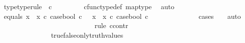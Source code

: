 \begin{isabellebody}
\ {\isasymomega}{}{\isacharunderscore}{\kern0pt}type{\isacharbrackleft}{\kern0pt}type{\isacharunderscore}{\kern0pt}rule{\isacharbrackright}{\kern0pt}{\isacharcolon}{\kern0pt}\ {\isachardoublequoteopen}{\isasymomega}{}\ {\isasymin}\isactrlsub c\ {\isasymOmega}{\isachardoublequoteclose}\isanewline
\ \ \ \ \ \ \isamarkupfalse%
\ cfunc{\isacharunderscore}{\kern0pt}type{\isacharunderscore}{\kern0pt}def\ map{\isacharunderscore}{\kern0pt}type\ \isamarkupfalse%
\ auto\isanewline
\ \ \ \ \isanewline
\ \ \ \ \isamarkupfalse%
\ equals{\isacharcolon}{\kern0pt}\ {\isachardoublequoteopen}{\isacharparenleft}{\kern0pt}x{}\ {\isasymamalg}\ x{}\ {\isasymcirc}\isactrlsub c\ case{\isacharunderscore}{\kern0pt}bool{\isacharparenright}{\kern0pt}\ {\isasymcirc}\isactrlsub c\ {\isasymomega}{}\ {\isacharequal}{\kern0pt}\ {\isacharparenleft}{\kern0pt}x{}\ {\isasymamalg}\ x{}\ {\isasymcirc}\isactrlsub c\ case{\isacharunderscore}{\kern0pt}bool{\isacharparenright}{\kern0pt}\ {\isasymcirc}\isactrlsub c\ {\isasymomega}{}{\isachardoublequoteclose}\isanewline
\ \ \ \ \isamarkupfalse%
\ {\isachardoublequoteopen}{\isasymomega}{}\ {\isacharequal}{\kern0pt}\ {\isasymomega}{}{\isachardoublequoteclose}\isanewline
\ \ \ \ \isamarkupfalse%
{\isacharparenleft}{\kern0pt}cases\ {\isachardoublequoteopen}{\isasymomega}{}\ {\isacharequal}{\kern0pt}\ {\isasymt}{\isachardoublequoteclose}{\isacharcomma}{\kern0pt}\ auto{\isacharparenright}{\kern0pt}\isanewline
\ \ \ \ \ \ \isamarkupfalse%
\ {\isachardoublequoteopen}{\isasymomega}{}\ {\isacharequal}{\kern0pt}\ {\isasymt}{\isachardoublequoteclose}\isanewline
\ \ \ \ \ \ \isamarkupfalse%
\ {\isachardoublequoteopen}{\isasymt}\ {\isacharequal}{\kern0pt}\ {\isasymomega}{}{\isachardoublequoteclose}\isanewline
\ \ \ \ \ \ \isamarkupfalse%
{\isacharparenleft}{\kern0pt}rule\ ccontr{\isacharparenright}{\kern0pt}\isanewline
\ \ \ \ \ \ \ \ \isamarkupfalse%
\ {\isachardoublequoteopen}\ {\isasymt}\ {\isasymnoteq}\ {\isasymomega}{}{\isachardoublequoteclose}\isanewline
\ \ \ \ \ \ \ \ \isamarkupfalse%
\ \isamarkupfalse%
\ {\isachardoublequoteopen}{\isasymf}\ {\isacharequal}{\kern0pt}\ {\isasymomega}{}{\isachardoublequoteclose}\isanewline
\ \ \ \ \ \ \ \ \ \ \isamarkupfalse%
\ {\isacartoucheopen}{\isasymt}\ {\isasymnoteq}\ {\isasymomega}{}{\isacartoucheclose}\ true{\isacharunderscore}{\kern0pt}false{\isacharunderscore}{\kern0pt}only{\isacharunderscore}{\kern0pt}truth{\isacharunderscore}{\kern0pt}values\ \isamarkupfalse%

\end{isabellebody}

